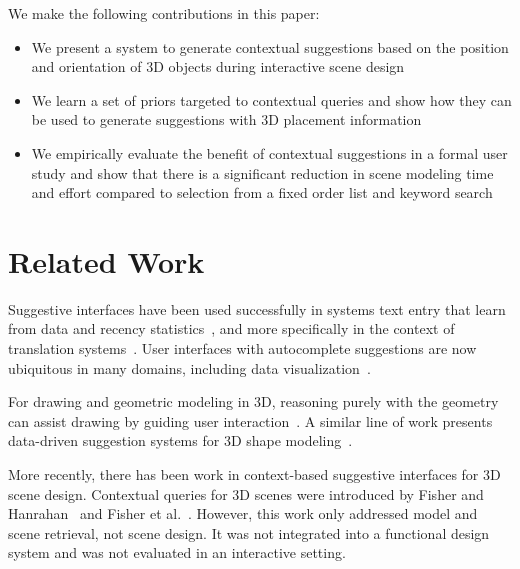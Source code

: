 \documentclass{sigchi}
\begin{document}
We make the following contributions in this paper:
\begin{itemize}[noitemsep]
  \item We present a system to generate contextual suggestions based on the position and orientation of 3D objects during interactive scene design
  \item We learn a set of priors targeted to contextual queries and show how they can be used to generate suggestions with 3D placement information
  \item We empirically evaluate the benefit of contextual suggestions in a formal user study and show that there is a significant reduction in scene modeling time and effort compared to selection from a fixed order list and keyword search
\end{itemize}

\section{Related Work}

Suggestive interfaces have been used successfully in systems text entry that learn from data and recency statistics~\cite{darragh1992reactive}, and more specifically in the context of translation systems~\cite{langlais2000transtype}.  User interfaces with autocomplete suggestions are now ubiquitous in many domains, including data visualization~\cite{koop2008viscomplete}.

For drawing and geometric modeling in 3D, reasoning purely with the geometry can assist drawing by guiding user interaction~\cite{igarashi2001suggestive,igarashi2007teddy}.  A similar line of work presents data-driven suggestion systems for 3D shape modeling~\cite{tsang2004suggestive,chaudhuri2010data}.

More recently, there has been work in context-based suggestive interfaces for 3D scene design.  Contextual queries for 3D scenes were introduced by Fisher and Hanrahan~\cite{fisher2010context} and Fisher et al.~\cite{fisher2011characterizing}.  However, this work only addressed model and scene retrieval, not scene design.  It was not integrated into a functional design system and was not evaluated in an interactive setting.
\end{document}
